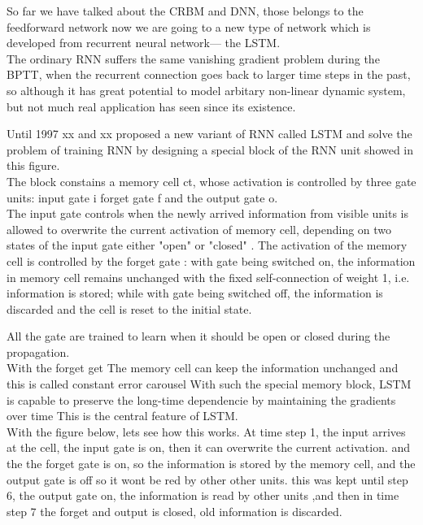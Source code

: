 \begin{frame}
 So far we have talked about the CRBM and DNN, those belongs to the feedforward network now we are going to a new type of network which is developed from recurrent neural network--- the LSTM. \\
 The ordinary RNN suffers the same vanishing gradient problem during the BPTT, when the recurrent connection goes back to larger time steps in the past, so although it has great potential to model arbitary non-linear dynamic system, but not much real application has seen since its existence. 
 
 Until 1997  xx and xx proposed a new variant of RNN called LSTM and solve the problem of training RNN by designing a special block of the RNN unit showed in this figure.\\
 
The block constains a memory cell ct, whose activation is controlled by three gate units: input gate i forget gate f and the output gate o. \\

The input gate controls when the newly arrived information from visible units is allowed to overwrite the current activation of memory cell, depending on two states of the input gate either "open" or "closed" . The activation of the memory cell is controlled by the forget gate : with gate being switched on, the information in memory cell remains unchanged with the fixed self-connection of weight 1, i.e. information is stored;  while with gate being switched off, the information is discarded and the cell is reset to the initial state. \\
\end{frame}
\begin{frame}
All the gate are trained to learn when it should be open or closed during the propagation.\\
With the forget get The memory cell can keep the information unchanged and this is called constant error carousel
With such the special memory block, LSTM is capable to preserve the long-time dependencie by maintaining the gradients over time
This is the central feature of LSTM. \\
With the figure below, lets see how this works.
At time step 1, the input arrives at the cell, the input gate is on, then it can overwrite the current activation. and the the forget gate is on, so the information is stored by the memory cell, and the output gate is off so it wont be red by other other units.  this was kept until step 6, the output gate on, the information is read by other units ,and then in time step 7 the forget and output is closed, old information is discarded. 
\end{frame}


